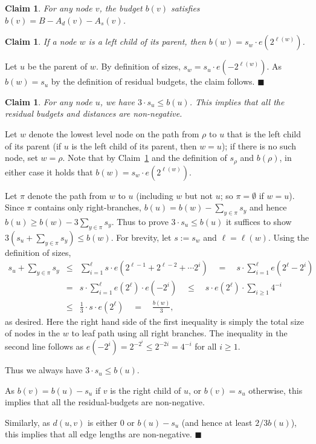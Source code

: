 \documentclass[11pt,letterpaper]{article}
\newtheorem{claim}[theorem]{Claim}
\numberwithin{algorithm}{section}
\newenvironment{proof}{

\noindent{\bf Proof:}}
{\hfill$\blacksquare$


}
\newcommand{\q}[1]{e\left(#1\right)}
\begin{document}
\begin{claim}
\label{lem:bv}
For any node $v$, the budget $b(v)$ satisfies $b(v)=B - A_d(v) - A_s(v)$.
\end{claim}

\begin{claim}
\label{size:val}
If a node $w$ is a left child of its parent, then $b(w) = s_w \cdot \q{2^{\ell(w)}}$.
\end{claim}
\begin{proof}
Let $u$ be the parent of $w$.
By definition of sizes, $s_w = s_u \cdot \q{-2^{\ell(w)}}$.
As $b(w) = s_u$ by the definition of residual budgets, the claim follows.
\end{proof}


\begin{claim}\label{cl:well-defn}
For any node $u$, we have $3\cdot s_u\le b(u)$. This implies that all the residual budgets and distances are non-negative.
\end{claim}
\begin{proof}
Let $w$ denote the lowest level node on the path from $\rho$ to $u$ that is the left child of its parent (if $u$ is the left child of its parent, then $w=u$); if there is no such node, set $w=\rho$.
Note that by Claim~\ref{size:val} and the definition of $s_\rho$ and $b(\rho)$, in either case it holds that $b(w)=s_w\cdot \q{2^{\ell(w)}}$.

Let $\pi$ denote the path from $w$ to $u$ (including $w$ but not $u$; so $\pi=\emptyset$ if $w=u$).
Since $\pi$ contains only right-branches, $b(u)=b(w)-\sum_{y\in \pi} s_y$ and hence $b(u)\ge b(w)- 3 \sum_{y\in \pi} s_y$. Thus to prove $3\cdot s_u\le b(u)$ it  suffices to show $3(s_u+ \sum_{y\in \pi} s_y)\le b(w)$. For brevity, let $s:=s_w$ and $\ell=\ell(w)$. Using the definition of sizes,
\begin{eqnarray*}
s_u+\sum_{y\in \pi} s_y  & \le  & \sum_{i=1}^{\ell} s\cdot \q{2^{\ell-1} + 2^{\ell-2} +\cdots 2^i}  \quad  = \quad   s\cdot \sum_{i=1}^{\ell} \q{2^{\ell}-2^i} \\ & = & s \cdot \sum_{i=1}^{\ell} \q{2^\ell} \cdot \q{-2^i} \quad  \le
\quad s\cdot \q{2^{\ell}} \cdot\sum_{i\ge 1} 4^{-i} \\
 & \le & \frac{1}{3}\cdot s\cdot \q{2^{\ell}} \quad = \quad \frac{b(w)}{3},
\end{eqnarray*}
as desired.  Here the right hand side of the first inequality is simply the total size of nodes in the $w$ to leaf path using all right branches. The inequality in the second line follows as $\q{-2^{i}}= 2^{-2^{i}} \leq 2^{-2i} = 4^{-i}$ for all $i\geq 1$.

Thus we always have $3\cdot s_u\le b(u)$.

As $b(v)=b(u)-s_u$ if $v$ is the right child of $u$, or $b(v) = s_u$ otherwise, this implies that all the residual-budgets are non-negative.

Similarly, as $d(u,v)$ is either $0$ or $b(u)-s_u$ (and hence at least $2/3 b(u)$), this implies that all edge lengths are non-negative.
\end{proof}
\end{document}
